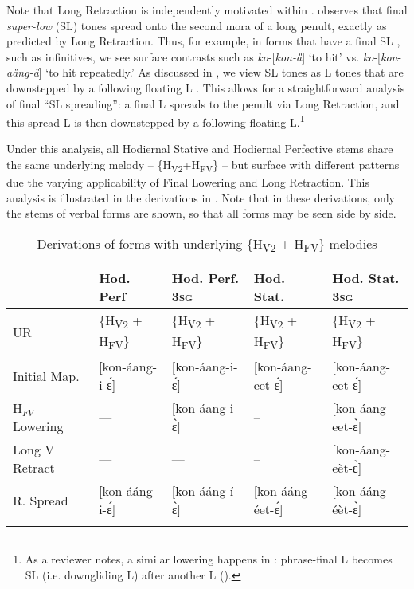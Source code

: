 \documentclass[output=paper,newtxmath,modfonts,nonflat,draft]{langsci/langscibook}
\begin{document}
Note that Long Retraction is independently motivated within . \citet{Roberts-Kohno2014} observes that final \textit{super-low} (SL) tones spread onto the second mora of a long penult, exactly as predicted by Long Retraction. Thus, for example, in forms that have a final SL , such as infinitives, we see surface contrasts such as \textit{ko}-[\textit{kon-ȁ}] ‘to hit’ vs. \textit{ko}-[\textit{kon}-\textit{aȁng-ȁ}] ‘to hit repeatedly.’ As discussed in , we view SL tones as L tones that are downstepped by a following floating L \citep[cf.][]{Clements1981}. This allows for a straightforward analysis of final “SL spreading”: a final L spreads to the penult via Long Retraction, and this spread L is then downstepped by a following floating L.\footnote{As a reviewer notes, a similar lowering happens in : phrase-final L becomes SL (i.e. downgliding L) after another L (\citealt[10]{Mwita2008,Marlo2014}).}

Under this analysis, all Hodiernal Stative and Hodiernal Perfective stems share the same underlying melody – \{H\textsubscript{V2}+H\textsubscript{FV}\} – but surface with different  patterns due the varying applicability of Final Lowering and Long Retraction. This analysis is illustrated in the derivations in . Note that in these derivations, only the stems of verbal forms are shown, so that all forms may be seen side by side.


\begin{table}
\footnotesize
\begin{tabularx}{\textwidth}{l@{~}QQQQ} 
\lsptoprule
 & {Hod. Perf} & {Hod. Perf. 3}\textsc{sg} & {Hod. Stat.} & {Hod. Stat. 3}\textsc{sg}\\
\midrule
UR & \{H\textsubscript{V2} + H\textsubscript{FV}\} & 
	  \{H\textsubscript{V2} + H\textsubscript{FV}\} & 
	      \{H\textsubscript{V2} + H\textsubscript{FV}\} & 
		  \{H\textsubscript{V2} + H\textsubscript{FV}\} \\
{Initial} Map. & [kon-áang-i-\'ɛ] & [kon-áang-i-\'ɛ] & [kon-áang-eet-\'ɛ] & [kon-áang-eet-\'ɛ]\\
H$_{FV}$ Lowering & --- & [kon-áang-i-\`ɛ] & -- & [kon-áang-eet-\`ɛ]\\
{Long V Retract} & --- & --- & -- & [kon-áang-eèt-\`ɛ]\\
{R. Spread} & [kon-ááng-i-\'ɛ] & [kon-ááng-í-\`ɛ] & [kon-ááng-éet-\'ɛ] & [kon-ááng-éèt-\`ɛ]\\
\lspbottomrule
\end{tabularx}
\caption{Derivations of forms with underlying \{H\textsubscript{V2} + H\textsubscript{FV}\} melodies}
\label{tab:jones:5}
\end{table}
 
\end{document}
